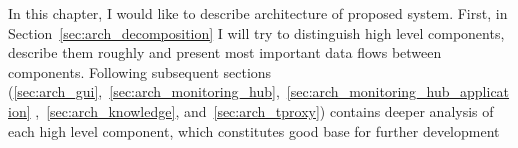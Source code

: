 In this chapter, I would like to describe architecture of proposed system. First, in
Section~\ref{sec:arch_decomposition} I
will try to distinguish high level components, describe them roughly and present most important data flows between
components. Following subsequent sections
(\ref{sec:arch_gui},~\ref{sec:arch_monitoring_hub},~\ref{sec:arch_monitoring_hub_application}
,~\ref{sec:arch_knowledge}, and~\ref{sec:arch_tproxy}) contains deeper analysis of each high level component, which
constitutes good base for further development













